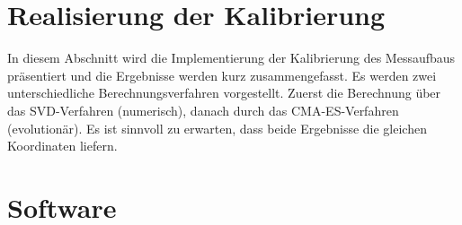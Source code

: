 \section{Realisierung der Kalibrierung}
\label{sec:calibration}
In diesem Abschnitt wird die Implementierung der Kalibrierung des Messaufbaus präsentiert und die Ergebnisse werden kurz zusammengefasst. Es werden zwei unterschiedliche Berechnungsverfahren vorgestellt. Zuerst die Berechnung über das SVD-Verfahren (numerisch), danach durch das CMA-ES-Verfahren (evolutionär). Es ist sinnvoll zu erwarten, dass beide Ergebnisse die gleichen Koordinaten liefern.
%

%
\section{Software}
\label{sec:sw}

